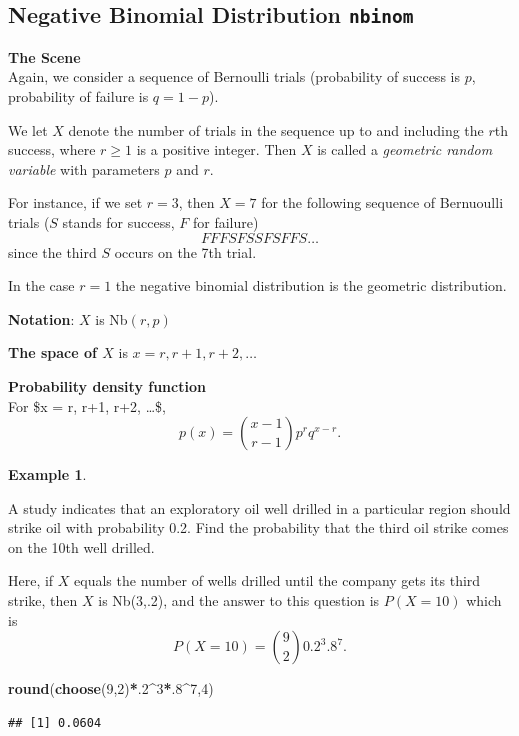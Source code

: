 \documentclass[
]{book}
\newenvironment{Shaded}{\begin{snugshade}}{\end{snugshade}}
\newcommand{\DecValTok}[1]{\textcolor[rgb]{0.00,0.00,0.81}{#1}}
\newcommand{\FunctionTok}[1]{\textcolor[rgb]{0.13,0.29,0.53}{\textbf{#1}}}
\newcommand{\NormalTok}[1]{#1}
\newcommand{\SpecialCharTok}[1]{\textcolor[rgb]{0.81,0.36,0.00}{\textbf{#1}}}
\theoremstyle{definition}
\theoremstyle{definition}
\newtheorem{example}{Example}[chapter]
\theoremstyle{definition}
\theoremstyle{definition}
\theoremstyle{remark}
\begin{document}
\subsection{\texorpdfstring{Negative Binomial Distribution \texttt{nbinom}}{Negative Binomial Distribution nbinom}}\label{negative-binomial-distribution-nbinom}

\textbf{The Scene}\\
Again, we consider a sequence of Bernoulli trials (probability of success is \(p\), probability of failure is \(q = 1-p\)).

We let \(X\) denote the number of trials in the sequence up to and including the \(r\)th success, where \(r \geq 1\) is a positive integer. Then \(X\) is called a \emph{geometric random variable} with parameters \(p\) and \(r\).

For instance, if we set \(r = 3\), then \(X = 7\) for the following sequence of Bernuoulli trials (\(S\) stands for success, \(F\) for failure)
\[F F F S F S S F S F F S \ldots \]
since the third \(S\) occurs on the 7th trial.

In the case \(r = 1\) the negative binomial distribution is the geometric distribution.

\textbf{Notation}: \(X\) is Nb\((r,p)\)

\textbf{The space of \(X\)} is \(x = r, r+1, r+2, \ldots\)

\textbf{Probability density function}\\
For \$x = r, r+1, r+2, \ldots \$, \[p(x)= \binom{x-1}{r-1}p^{r}q^{x-r}.\]

\begin{example}
\protect\hypertarget{exm:drill-oil-negbinom-R}{}\label{exm:drill-oil-negbinom-R}

A study indicates that an exploratory oil well drilled in a particular region should strike oil with probability 0.2. Find the probability that the third oil strike comes on the 10th well drilled.

Here, if \(X\) equals the number of wells drilled until the company gets its third strike, then \(X\) is Nb(3,.2), and the answer to this question is \(P(X=10)\) which is \[P(X=10)=\binom{9}{2}0.2^{3}.8^{7}.\]

\begin{Shaded}
\begin{Highlighting}[]
\FunctionTok{round}\NormalTok{(}\FunctionTok{choose}\NormalTok{(}\DecValTok{9}\NormalTok{,}\DecValTok{2}\NormalTok{)}\SpecialCharTok{*}\NormalTok{.}\DecValTok{2}\SpecialCharTok{\^{}}\DecValTok{3}\SpecialCharTok{*}\NormalTok{.}\DecValTok{8}\SpecialCharTok{\^{}}\DecValTok{7}\NormalTok{,}\DecValTok{4}\NormalTok{)}
\end{Highlighting}
\end{Shaded}

\begin{verbatim}
## [1] 0.0604
\end{verbatim}

\end{example}
\end{document}
